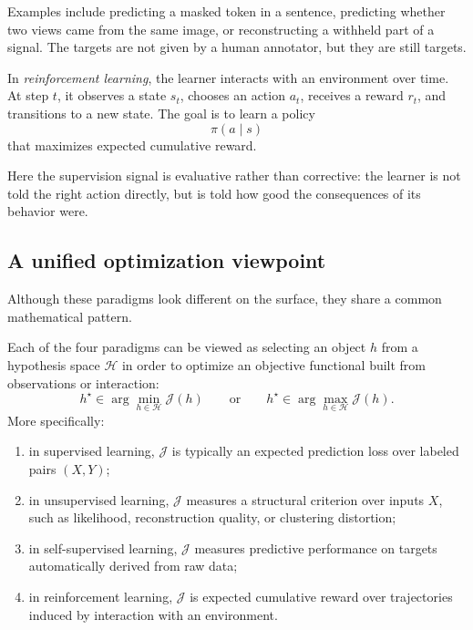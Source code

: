 Examples include predicting a masked token in a sentence, predicting whether two views came from the same image, or reconstructing a withheld part of a signal. The targets are not given by a human annotator, but they are still targets.

\begin{definition}
In \emph{reinforcement learning}, the learner interacts with an environment over time. At step $t$, it observes a state $s_t$, chooses an action $a_t$, receives a reward $r_t$, and transitions to a new state. The goal is to learn a policy
\[
\pi(a\mid s)
\]
that maximizes expected cumulative reward.
\end{definition}

Here the supervision signal is evaluative rather than corrective: the learner is not told the right action directly, but is told how good the consequences of its behavior were.

\subsection*{A unified optimization viewpoint}

Although these paradigms look different on the surface, they share a common mathematical pattern.

\begin{proposition}
Each of the four paradigms can be viewed as selecting an object $h$ from a hypothesis space $\mathcal H$ in order to optimize an objective functional built from observations or interaction:
\[
h^\star \in \arg\min_{h\in\mathcal H} \mathcal J(h)
\qquad\text{or}\qquad
h^\star \in \arg\max_{h\in\mathcal H} \mathcal J(h).
\]
More specifically:
\begin{enumerate}
    \item in supervised learning, $\mathcal J$ is typically an expected prediction loss over labeled pairs $(X,Y)$;
    \item in unsupervised learning, $\mathcal J$ measures a structural criterion over inputs $X$, such as likelihood, reconstruction quality, or clustering distortion;
    \item in self-supervised learning, $\mathcal J$ measures predictive performance on targets automatically derived from raw data;
    \item in reinforcement learning, $\mathcal J$ is expected cumulative reward over trajectories induced by interaction with an environment.
\end{enumerate}
\end{proposition}

